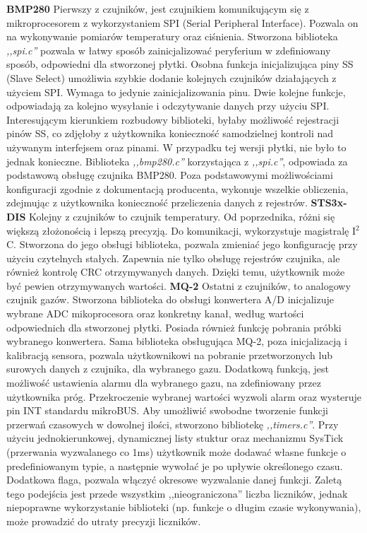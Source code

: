 \textbf{BMP280}
\newline
Pierwszy z czujników, jest czujnikiem komunikującym się z mikroprocesorem z wykorzystaniem SPI (Serial Peripheral Interface). Pozwala on na wykonywanie pomiarów temperatury oraz ciśnienia. Stworzona biblioteka \textit{,,spi.c''} pozwala w łatwy sposób zainicjalizować peryferium w zdefiniowany sposób, odpowiedni dla stworzonej płytki. Osobna funkcja inicjalizująca piny SS (Slave Select) umożliwia szybkie dodanie kolejnych czujników działających z użyciem SPI. Wymaga to jedynie zainicjalizowania pinu. Dwie kolejne funkcje, odpowiadają za kolejno wysyłanie i odczytywanie danych przy użyciu SPI. Interesującym kierunkiem rozbudowy biblioteki, byłaby możliwość rejestracji pinów SS, co zdjęłoby z użytkownika konieczność samodzielnej kontroli nad używanym interfejsem oraz pinami. W przypadku tej wersji płytki, nie było to jednak konieczne. Biblioteka \textit{,,bmp280.c''} korzystająca z \textit{,,spi.c''}, odpowiada za podstawową obsługę czujnika BMP280. Poza podstawowymi możliwościami konfiguracji zgodnie z dokumentacją producenta, wykonuje wszelkie obliczenia, zdejmując z użytkownika konieczność przeliczenia danych z rejestrów.
\newline
\newline
\textbf{STS3x-DIS}
\newline
Kolejny z czujników to czujnik temperatury. Od poprzednika, różni się większą złożonością i lepszą precyzją. Do komunikacji, wykorzystuje magistralę I$^2$C. Stworzona do jego obsługi biblioteka, pozwala zmieniać jego konfigurację przy użyciu czytelnych stałych. Zapewnia nie tylko obsługę rejestrów czujnika, ale również kontrolę CRC otrzymywanych danych. Dzięki temu, użytkownik może być pewien otrzymywanych wartości.
\newline
\newline
\textbf{MQ-2}
\newline
Ostatni z czujników, to analogowy czujnik gazów. Stworzona biblioteka do obsługi konwertera A/D inicjalizuje wybrane ADC mikoprocesora oraz konkretny kanał, według wartości odpowiednich dla stworzonej płytki. Posiada również funkcję pobrania próbki wybranego konwertera. Sama biblioteka obsługująca MQ-2, poza inicjalizacją i kalibracją sensora, pozwala użytkownikowi na pobranie przetworzonych lub surowych danych z czujnika, dla wybranego gazu. Dodatkową funkcją, jest możliwość ustawienia alarmu dla wybranego gazu, na zdefiniowany przez użytkownika próg. Przekroczenie wybranej wartości wyzwoli alarm oraz wysteruje pin INT standardu mikroBUS\texttrademark. Aby umożliwić swobodne tworzenie funkcji przerwań czasowych w dowolnej ilości, stworzono bibliotekę \textit{,,timers.c''}. Przy użyciu jednokierunkowej, dynamicznej listy stuktur oraz mechanizmu SysTick (przerwania wyzwalanego co 1ms) użytkownik może dodawać własne funkcje o predefiniowanym typie, a następnie wywołać je po upływie określonego czasu. Dodatkowa flaga, pozwala włączyć okresowe wyzwalanie danej funkcji. Zaletą tego podejścia jest przede wszystkim ,,nieograniczona'' liczba liczników, jednak niepoprawne wykorzystanie biblioteki (np. funkcje o długim czasie wykonywania), może prowadzić do utraty precyzji liczników.
